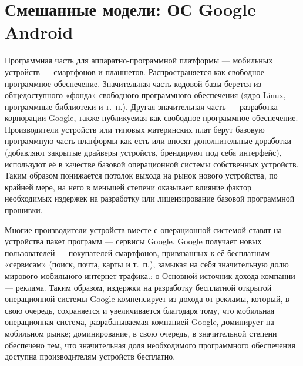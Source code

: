 \documentclass{article}
\begin{document}
\section*{Смешанные модели: ОС Google Android}

Программная часть для аппаратно-программной платформы — мобильных устройств — смартфонов и планшетов. Распространяется как свободное программное обеспечение. Значительная часть кодовой базы берется из общедоступного «фонда» свободного программного обеспечения (ядро Linux, программные библиотеки и т.~п.). Другая значительная часть — разработка корпорации Google, также публикуемая как свободное программное обеспечение.
 Производители устройств или типовых материнских плат берут базовую программную часть платформы как есть или вносят дополнительные доработки (добавляют закрытые драйверы устройств, брендируют под себя интерфейс), используют её в качестве базовой операционной системы собственных устройств. Таким образом понижается потолок выхода на рынок нового устройства, по крайней мере, на него в меньшей степени оказывает влияние фактор необходимых издержек на разработку или лицензирование базовой программной прошивки.

Многие производители устройств вместе с операционной системой ставят на устройства пакет программ — сервисы Google. Google получает новых пользователей — покупателей смартфонов, привязанных к её бесплатным «сервисам» (поиск, почта, карты и т.~п.), замыкая на себя значительную долю мирового мобильного интернет-трафика.: о Основной источник дохода компании — реклама. Таким образом, издержки на разработку бесплатной открытой операционной системы Google компенсирует из дохода от рекламы, который, в свою очередь, сохраняется и увеличивается благодаря тому, что мобильная операционная система, разрабатываемая компанией Google, доминирует на мобильном рынке; доминирование, в свою очередь, в значительной степени обеспечено тем, что значительная доля необходимого программного обеспечения доступна производителям устройств бесплатно.
\end{document}
